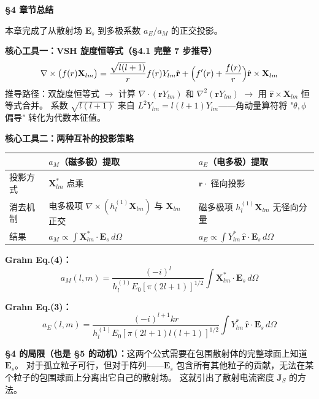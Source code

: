 \begin{chaptersummary}

\textbf{§4 章节总结}

本章完成了从散射场 $\mathbf{E}_s$ 到多极系数 $a_E/a_M$ 的正交投影。

\textbf{核心工具一：VSH 旋度恒等式（§4.1 完整 7 步推导）}
$$
\nabla\times\bigl(f(r)\mathbf{X}_{lm}\bigr)
= \frac{\sqrt{l(l+1)}}{r}f(r)Y_{lm}\hat{\mathbf{r}}
+ \Bigl(f'(r) + \frac{f(r)}{r}\Bigr)\hat{\mathbf{r}}\times\mathbf{X}_{lm}
$$
推导路径：双旋度恒等式 $\to$ 计算 $\nabla\cdot(\mathbf{r}Y_{lm})$ 和 $\nabla^2(\mathbf{r}Y_{lm})$ $\to$ 用 $\hat{\mathbf{r}}\times\mathbf{X}_{lm}$ 恒等式合并。
系数 $\sqrt{l(l+1)}$ 来自 $L^2 Y_{lm} = l(l+1)Y_{lm}$——角动量算符将 "$\theta,\phi$ 偏导" 转化为代数本征值。

\textbf{核心工具二：两种互补的投影策略}

\begin{center}
\begin{tabular}{p{3.5cm}p{5cm}p{5cm}}
 & $a_M$（磁多极）提取 & $a_E$（电多极）提取 \\ \hline
投影方式 & $\mathbf{X}_{lm}^*$ 点乘 & $\hat{\mathbf{r}}\cdot$ 径向投影 \\
消去机制 & 电多极项 $\nabla\times(h_l^{(1)}\mathbf{X}_{lm})$ 与 $\mathbf{X}_{lm}$ 正交 & 磁多极项 $h_l^{(1)}\mathbf{X}_{lm}$ 无径向分量 \\
结果 & $\displaystyle a_M \propto \int\mathbf{X}_{lm}^*\cdot\mathbf{E}_s\,d\Omega$ & $\displaystyle a_E \propto \int Y_{lm}^*\,\hat{\mathbf{r}}\cdot\mathbf{E}_s\,d\Omega$
\end{tabular}
\end{center}

\textbf{Grahn Eq.(4)：}
$$
a_M(l,m) = \frac{(-i)^{l}}{h_l^{(1)}E_0[\pi(2l+1)]^{1/2}}
\int \mathbf{X}_{lm}^*\cdot\mathbf{E}_s\,d\Omega
$$

\textbf{Grahn Eq.(3)：}
$$
a_E(l,m) = \frac{(-i)^{l+1}kr}{h_l^{(1)}E_0[\pi(2l+1)l(l+1)]^{1/2}}
\int Y_{lm}^*\,\hat{\mathbf{r}}\cdot\mathbf{E}_s\,d\Omega
$$

\textbf{§4 的局限（也是 §5 的动机）：}这两个公式需要在包围散射体的完整球面上知道 $\mathbf{E}_s$。
对于孤立粒子可行，但对于阵列——$\mathbf{E}_s$ 包含所有其他粒子的贡献，无法在某个粒子的包围球面上分离出它自己的散射场。
这就引出了散射电流密度 $\mathbf{J}_S$ 的方法。

\end{chaptersummary}

\newpage

